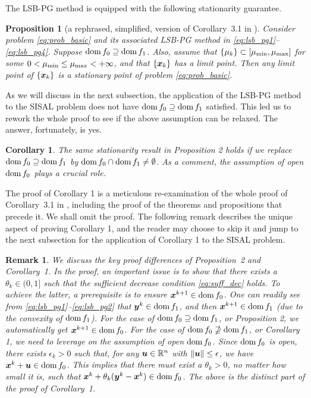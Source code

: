 \documentclass[10pt,twocolumn,twoside]{IEEEtran}
\newtheorem{Prop}{Proposition}
\newtheorem{Corollary}{Corollary}
\newtheorem{Remark}{Remark}
\begin{document}
The LSB-PG method is equipped with the following stationarity guarantee.

\begin{Prop}[a rephrased, simplified, version of Corollary~3.1 in \cite{BLPP16}]
	Consider problem \eqref{eq:prob_basic} and its associated LSB-PG method in \eqref{eq:lsb_pg1}--\eqref{eq:lsb_pg4}.
	Suppose ${\rm dom}\, f_0 \supseteq {\rm dom}\, f_1$.
	Also, assume that $\{ \mu_k \} \subset [ \mu_{\rm min}, \mu_{\rm max} ]$ for some $0 < \mu_{\rm min} \leq \mu_{\rm max} < +\infty$, and that $\{ {\bm x}_k \}$ has a limit point.
	Then any limit point of $\{ {\bm x}_k \}$ is a stationary point of problem \eqref{eq:prob_basic}.
\end{Prop}

As we will discuss in the next subsection, the application of the LSB-PG method to the SISAL problem does not have ${\rm dom}\, f_0 \supseteq {\rm dom}\, f_1$ satisfied.
This led us to rework the whole proof to see if the above assumption can be relaxed.
The answer, fortunately, is yes.

\begin{Corollary}
	The same stationarity result in Proposition 2 holds if we replace ${\rm dom}\, f_0 \supseteq {\rm dom}\, f_1$ by ${\rm dom}\, f_0 \cap {\rm dom}\, f_1 \neq \emptyset$.
	As a comment, the assumption of open ${\rm dom}\, f_0$ plays a crucial role.
\end{Corollary}

The proof of Corollary 1 is a meticulous re-examination of the whole proof of Corollary~3.1 in \cite{BLPP16}, including the proof of the theorems and propositions that precede it.
We shall omit the proof.
The following remark describes the unique aspect of proving Corollary 1, and the reader may choose to skip it and jump to the next subsection for the application of Corollary 1 to the SISAL problem.

\begin{Remark}
	We discuss the key proof differences of Proposition~2 and Corollary~1.
	In the proof, an important issue is to show that there exists a $\theta_k \in (0,1]$ such that the sufficient decrease condition \eqref{eq:suff_dec} holds.
	To achieve the latter, a prerequisite is to ensure ${\bm x}^{k+1} \in {\rm dom}\, f_0$.
	One can readily see from \eqref{eq:lsb_pg1}--\eqref{eq:lsb_pg2} that ${\bm y}^k \in {\rm dom}\, f_1$, and then ${\bm x}^{k+1} \in {\rm dom}\, f_1$ (due to the convexity of ${\rm dom}\, f_1$).
	For the case of ${\rm dom}\, f_0 \supseteq {\rm dom}\, f_1$, or Proposition 2, we automatically get ${\bm x}^{k+1} \in {\rm dom}\, f_0$.
	For the case of ${\rm dom}\, f_0 \nsupseteq {\rm dom}\, f_1$, or Corollary 1, we need to leverage on the assumption of open ${\rm dom}\, f_0$.
	Since ${\rm dom}\, f_0$ is open, there exists $\epsilon_k > 0$ such that, for any ${\bm u} \in \mathbb{R}^n$ with  $\|  {\bm u} \| \leq \epsilon$, we have ${\bm x}^k + {\bm u} \in {\rm dom}\, f_0$.
	This implies that there must exist a $\theta_k > 0$, no matter how small it is, such that ${\bm x}^k + \theta_k ({\bm y}^k - {\bm x}^k ) \in {\rm dom}\, f_0$.
	The above is the distinct part of the proof of Corollary~1.
\end{Remark}
\end{document}
